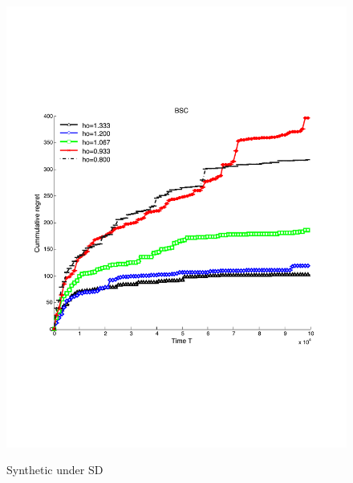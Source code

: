 \begin{figure}[!bt]
	\begin{minipage}{4cm}
		\centering
		\vspace{.5cm}
		\includegraphics[scale=0.21]{../Simulations/Figures/BSC_SD}
		\label{fig:BSC_SD}
		\vspace{-.2cm}
		\caption{Synthetic under SD}
	\end{minipage}
	\begin{minipage}{4cm}
		\centering

\end{minipage}
\end{figure}
